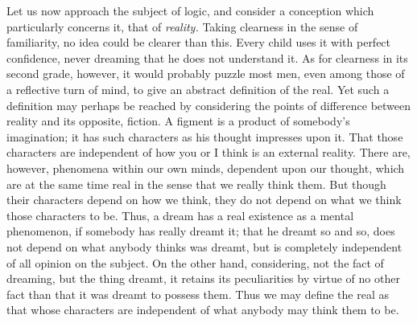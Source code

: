 Let us now approach the subject of logic, and consider a conception which particularly concerns it, that of \emph{reality.} Taking clearness in the sense of familiarity, no idea could be clearer than this. Every child uses it with perfect confidence, never dreaming that he does not understand it. As for clearness in its second grade, however, it would probably puzzle most men, even among those of a reflective turn of mind, to give an abstract definition of the real. Yet such a definition may perhaps be reached by considering the points of difference between reality and its opposite, fiction. A figment is a product of somebody's imagination; it has such characters as his thought impresses upon it. That those characters are independent of how you or I think is an external reality. There are, however, phenomena within our own minds, dependent upon our thought, which are at the same time real in the sense that we really think them. But though their characters depend on how we think, they do not depend on what we think those characters to be. Thus, a dream has a real existence as a mental phenomenon, if somebody has really dreamt it; that he dreamt so and so, does not depend on what anybody thinks was dreamt, but is completely independent of all opinion on the subject. On the other hand, considering, not the fact of dreaming, but the thing dreamt, it retains its peculiarities by virtue of no other fact than that it was dreamt to possess them. Thus we may define the real as that whose characters are independent of what anybody may think them to be. 
 
